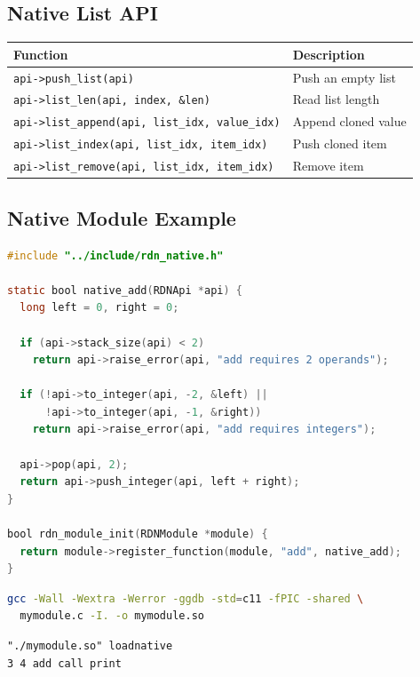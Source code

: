 \documentclass[11pt,a4paper]{article}
\newcommand{\code}[1]{\texttt{#1}}
\begin{document}
\subsection{Native List API}

\begin{longtable}{ll}
\toprule
Function & Description \\
\midrule
\code{api->push\_list(api)} & Push an empty list \\
\code{api->list\_len(api, index, \&len)} & Read list length \\
\code{api->list\_append(api, list\_idx, value\_idx)} & Append cloned value \\
\code{api->list\_index(api, list\_idx, item\_idx)} & Push cloned item \\
\code{api->list\_remove(api, list\_idx, item\_idx)} & Remove item \\
\bottomrule
\end{longtable}

\subsection{Native Module Example}

\begin{lstlisting}[language=C]
#include "../include/rdn_native.h"

static bool native_add(RDNApi *api) {
  long left = 0, right = 0;

  if (api->stack_size(api) < 2)
    return api->raise_error(api, "add requires 2 operands");

  if (!api->to_integer(api, -2, &left) ||
      !api->to_integer(api, -1, &right))
    return api->raise_error(api, "add requires integers");

  api->pop(api, 2);
  return api->push_integer(api, left + right);
}

bool rdn_module_init(RDNModule *module) {
  return module->register_function(module, "add", native_add);
}
\end{lstlisting}

\begin{lstlisting}[language=bash]
gcc -Wall -Wextra -Werror -ggdb -std=c11 -fPIC -shared \
  mymodule.c -I. -o mymodule.so
\end{lstlisting}

\begin{lstlisting}[language=Raden]
"./mymodule.so" loadnative
3 4 add call print
\end{lstlisting}
\end{document}
